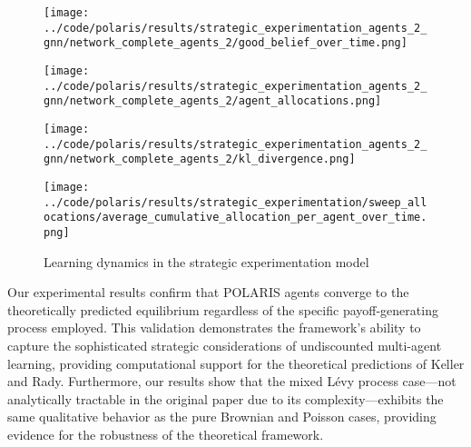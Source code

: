\begin{figure}[!htbp]
    \centering
    \begin{minipage}[t]{0.48\textwidth}
        \centering
        \texttt{[image: ../code/polaris/results/strategic\_experimentation\_agents\_2\_gnn/network\_complete\_agents\_2/good\_belief\_over\_time.png]}
        \label{fig:good_belief_over_time}
    \end{minipage}
    \hfill
    \begin{minipage}[t]{0.48\textwidth}
        \centering
        \texttt{[image: ../code/polaris/results/strategic\_experimentation\_agents\_2\_gnn/network\_complete\_agents\_2/agent\_allocations.png]}
        \label{fig:agent_allocations}
    \end{minipage}
    
    \vspace{0.3cm}
    
    \begin{minipage}[t]{0.48\textwidth}
        \centering
        \texttt{[image: ../code/polaris/results/strategic\_experimentation\_agents\_2\_gnn/network\_complete\_agents\_2/kl\_divergence.png]}
        \label{fig:kl_divergence}
    \end{minipage}
    \hfill
    \begin{minipage}[t]{0.48\textwidth}
        \centering
        \texttt{[image: ../code/polaris/results/strategic\_experimentation/sweep\_allocations/average\_cumulative\_allocation\_per\_agent\_over\_time.png]}
        \label{fig:average_cumulative_allocation_per_agent_over_time}
    \end{minipage}
    
    \caption{Learning dynamics in the strategic experimentation model}
    \label{fig:strategic_experimentation_results}
\end{figure}


Our experimental results confirm that POLARIS agents converge to the theoretically predicted equilibrium regardless of the specific payoff-generating process employed. This validation demonstrates the framework's ability to capture the sophisticated strategic considerations of undiscounted multi-agent learning, providing computational support for the theoretical predictions of Keller and Rady. Furthermore, our results show that the mixed Lévy process case—not analytically tractable in the original paper due to its complexity—exhibits the same qualitative behavior as the pure Brownian and Poisson cases, providing evidence for the robustness of the theoretical framework.

